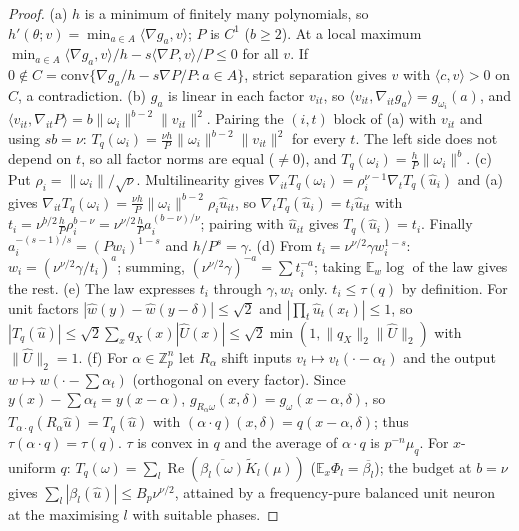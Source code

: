 \documentclass[11pt]{article}
\theoremstyle{remark}\newtheorem{remark}[theorem]{Remark}
\newcommand{\E}{\mathbb E}\newcommand{\R}{\mathbb R}\newcommand{\Re}{\operatorname{Re}}
\begin{document}
\begin{proof}
(a) $h$ is a minimum of finitely many polynomials, so $h'(\theta;v)=\min_{a\in A}\langle\nabla g_a,v\rangle$; $P$ is $C^1$ ($b\ge2$).
At a local maximum $\min_{a\in A}\langle\nabla g_a,v\rangle/h-s\langle\nabla P,v\rangle/P\le0$ for all $v$. If $0\notin
C=\mathrm{conv}\{\nabla g_a/h-s\nabla P/P:a\in A\}$, strict separation gives $v$ with $\langle c,v\rangle>0$ on $C$, a contradiction.
(b) $g_a$ is linear in each factor $v_{it}$, so $\langle v_{it},\nabla_{it}g_a\rangle=g_{\omega_i}(a)$, and $\langle v_{it},\nabla_{it}P\rangle=b\|\omega_i\|^{b-2}\|v_{it}\|^2$.
Pairing the $(i,t)$ block of (a) with $v_{it}$ and using $sb=\nu$: $T_q(\omega_i)=\frac{\nu h}P\|\omega_i\|^{b-2}\|v_{it}\|^2$ for every $t$. The left side does not
depend on $t$, so all factor norms are equal ($\ne0$), and $T_q(\omega_i)=\frac hP\|\omega_i\|^b$.
(c) Put $\rho_i=\|\omega_i\|/\sqrt\nu$. Multilinearity gives $\nabla_{it}T_q(\omega_i)=\rho_i^{\nu-1}\nabla_tT_q(\hat u_i)$ and (a) gives
$\nabla_{it}T_q(\omega_i)=\frac{\nu h}P\|\omega_i\|^{b-2}\rho_i\hat u_{it}$, so $\nabla_tT_q(\hat u_i)=t_i\hat u_{it}$ with
$t_i=\nu^{b/2}\frac hP\rho_i^{b-\nu}=\nu^{\nu/2}\frac hPa_i^{(b-\nu)/\nu}$; pairing with $\hat u_{it}$ gives $T_q(\hat u_i)=t_i$. Finally
$a_i^{-(s-1)/s}=(Pw_i)^{1-s}$ and $h/P^s=\gamma$.
(d) From $t_i=\nu^{\nu/2}\gamma w_i^{1-s}$: $w_i=(\nu^{\nu/2}\gamma/t_i)^a$; summing, $(\nu^{\nu/2}\gamma)^{-a}=\sum t_i^{-a}$; taking $\E_w\log$ of the law gives the rest.
(e) The law expresses $t_i$ through $\gamma,w_i$ only. $t_i\le\tau(q)$ by definition. For unit factors $|\hat w(y)-\hat w(y-\delta)|\le\sqrt2$ and
$|\prod_t\hat u_t(x_t)|\le1$, so $|T_q(\hat u)|\le\sqrt2\sum_xq_X(x)|\hat U(x)|\le\sqrt2\min(1,\|q_X\|_2\|\hat U\|_2)$ with $\|\hat U\|_2=1$.
(f) For $\alpha\in\mathbb Z_p^n$ let $R_\alpha$ shift inputs $v_t\mapsto v_t(\cdot-\alpha_t)$ and the output $w\mapsto w(\cdot-\sum\alpha_t)$ (orthogonal on every factor).
Since $y(x)-\sum\alpha_t=y(x-\alpha)$, $g_{R_\alpha\omega}(x,\delta)=g_\omega(x-\alpha,\delta)$, so $T_{\alpha\cdot q}(R_\alpha\hat u)=T_q(\hat u)$ with
$(\alpha\cdot q)(x,\delta)=q(x-\alpha,\delta)$; thus $\tau(\alpha\cdot q)=\tau(q)$. $\tau$ is convex in $q$ and the average of $\alpha\cdot q$ is $p^{-n}\mu_q$.
For $x$-uniform $q$: $T_q(\omega)=\sum_l\Re(\overline{\beta_l(\omega)}\tilde K_l(\mu))$ ($\E_x\Phi_l=\overline{\beta_l}$); the budget at $b=\nu$
gives $\sum_l|\beta_l(\hat u)|\le B_p\nu^{\nu/2}$, attained by a frequency-pure balanced unit neuron at the maximising $l$ with suitable phases.
\end{proof}
\end{document}
